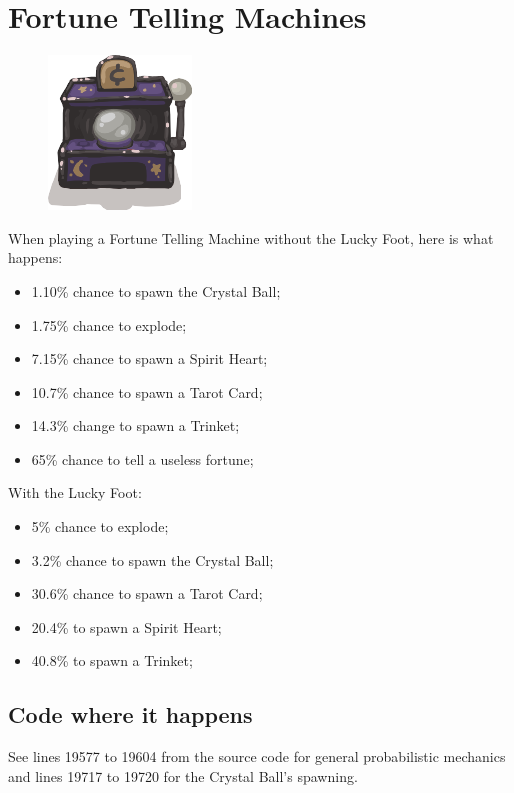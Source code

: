 \section{Fortune Telling Machines}\label{sec:ftmachines}

\begin{figure}
   \begin{center}
      \includegraphics{img/FortuneTelling.png}
   \end{center}
\end{figure}
When playing a Fortune Telling Machine without the Lucky Foot, here is what happens:
\begin{itemize}
\item 1.10\% chance to spawn the Crystal Ball;
\item 1.75\% chance to explode;
\item 7.15\% chance to spawn a Spirit Heart;
\item 10.7\% chance to spawn a Tarot Card;
\item 14.3\% change to spawn a Trinket;
\item 65\% chance to tell a useless fortune;
\end{itemize}


\noindent With the Lucky Foot:
\begin{itemize}
\item 5\% chance to explode;
\item 3.2\% chance to spawn the Crystal Ball;
\item 30.6\% chance to spawn a Tarot Card;
\item 20.4\% to spawn a Spirit Heart;
\item 40.8\% to spawn a Trinket;
\end{itemize}


\subsection{Code where it happens}
See lines 19577 to 19604 from the source code for general probabilistic mechanics and lines 19717 to 19720 for the Crystal Ball's spawning.
